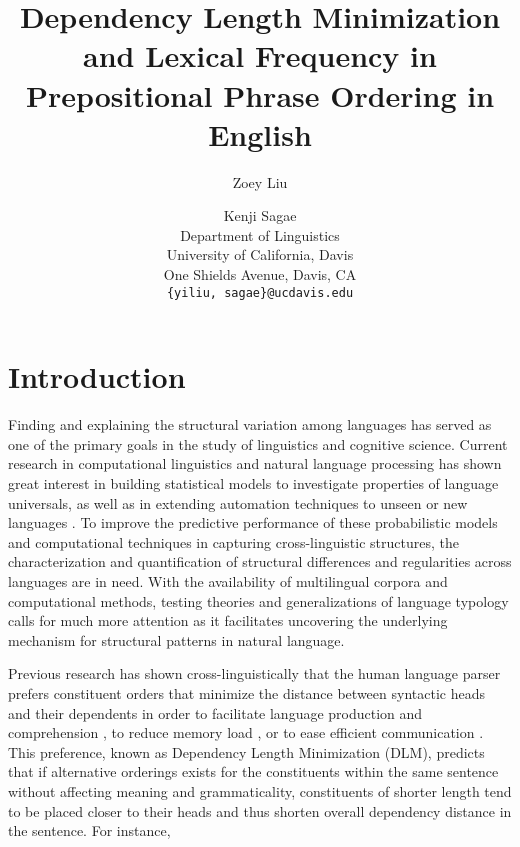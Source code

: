 \documentclass[11pt,letterpaper]{article}
\title{Dependency Length Minimization and Lexical Frequency in Prepositional Phrase Ordering in English}
\author{Zoey Liu \and Kenji Sagae \\
 Department of Linguistics \\ University of California, Davis \\ One Shields Avenue, Davis, CA \\ {\tt \{yiliu, sagae\}@ucdavis.edu}}
\date{}
\begin{document}
\maketitle


\section{Introduction}
Finding and explaining the structural variation among languages has served as one of the primary goals in the study of linguistics and cognitive science. Current research in computational linguistics and natural language processing has shown great interest in building statistical models to investigate properties of language universals, as well as in extending automation techniques to unseen or new languages \cite{Merlo:2015}. To improve the predictive performance of these probabilistic models and computational techniques in capturing cross-linguistic structures, the characterization and quantification of structural differences and regularities across languages are in need. With the availability of multilingual corpora and computational methods, testing theories and generalizations of language typology calls for much more attention as it facilitates uncovering the underlying mechanism for structural patterns in natural language.

Previous research has shown cross-linguistically that the human language parser prefers constituent orders that minimize the distance between syntactic heads and their dependents \cite{Futrell:2015} in order to facilitate language production and comprehension \cite{Levy:2013}, to reduce memory load \cite{Gibson:1998}, or to ease efficient communication \cite{Hawkins:2014}. This preference, known as Dependency Length Minimization (DLM), predicts that if alternative orderings exists for the constituents within the same sentence without affecting meaning and grammaticality, constituents of shorter length tend to be placed closer to their heads and thus shorten overall dependency distance in the sentence. For instance, 
\end{document}
